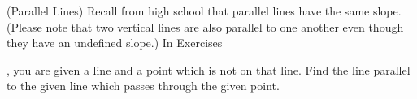 {
\label{parallellines}

\noindent (Parallel Lines) Recall from high school that parallel lines have the same slope.  (Please note that two vertical lines are also parallel to one another even though they have an undefined slope.) In Exercises}
{, you are given a line and a point which is not on that line.  Find the line parallel to the given line which passes through the given point.
}

